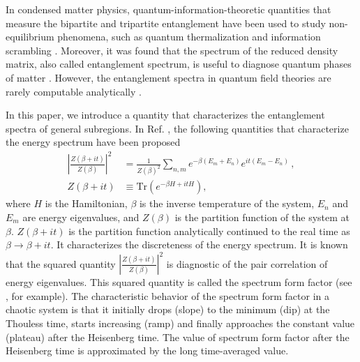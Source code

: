 \documentclass[%
twocolumn, 
secnumarabic,amssymb, preprintnumbers, superscriptaddress, aps, prl]{revtex4-1}
\newcommand{\Tr}{\text{Tr}}
\newcommand{\f}{\frac}
\def\f {\frac}
\def\Tr{\mathrm{Tr}}
\begin{document}
In condensed matter physics, quantum-information-theoretic quantities that measure the bipartite and tripartite entanglement have been used to study non-equilibrium phenomena, such as quantum thermalization and information scrambling \cite{Calabrese_2005,Calabrese_2007,Hosur_2016,Nie_2019,Kudler_Flam_2020}.
Moreover, it was found that the spectrum of the reduced density matrix, also called entanglement spectrum, is useful to diagnose quantum phases of matter \cite{Li_2008,Pollmann_2010}. However, the entanglement spectra in quantum field theories are rarely computable analytically \cite{Casini_2011}.



In this paper, we %
introduce a quantity that characterizes %
the entanglement spectra of general subregions. %
In Ref. \cite{2017JHEP...05..118C,Papadodimas_2015}, the following quantities that characterize the energy spectrum have been  proposed 
\begin{align}
 \left|\f{Z(\beta+it)}{Z(\beta)}\right|^2&= \f{1}{Z(\beta)^2}\sum_{n,m}e^{-\beta (E_m+E_n)}e^{i t (E_m-E_n)}\, ,\\
 Z(\beta+it) &\equiv \Tr(e^{-\beta H+it H}),
\end{align}
where $H$ is the Hamiltonian, $\beta$ is the inverse temperature of the system, $E_n$ and $E_m$ are energy eigenvalues, and $Z(\beta)$ is the partition function of the system at $\beta$.
$Z(\beta+it)$ is the  partition function analytically continued to the real time as $\beta\rightarrow \beta +it$. It characterizes the discreteness of the energy spectrum.  It is known that 
the squared quantity $\left|\f{Z(\beta+it)}{Z(\beta)}\right|^2$ %
is  diagnostic of the pair correlation of energy eigenvalues. This squared quantity is called the spectrum form factor (see \cite{mehta2004random}, for example).
The characteristic behavior of the spectrum form factor in a chaotic system is that it initially drops (slope) to the minimum (dip) at the Thouless time, starts increasing (ramp) and finally approaches the constant value (plateau) after the Heisenberg time. The value of spectrum form factor after the Heisenberg time is approximated by the long time-averaged value. 
\end{document}

